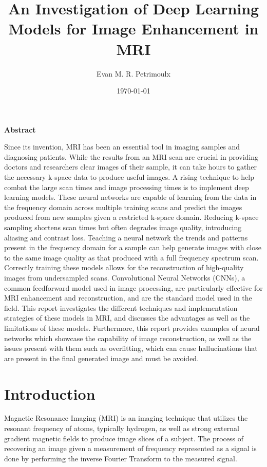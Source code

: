 \documentclass[14pt]{extreport}
\title{An Investigation of Deep Learning Models for Image Enhancement in MRI}
\author{Evan M. R. Petrimoulx}
\date{\today}
\renewenvironment{abstract}{
    \begin{center}
        \bfseries Abstract
    \end{center}
    \vspace{-1em} %
    \itshape
}{}
\begin{document}
    \maketitle
    \setcounter{page}{2}
    \vspace{-2cm}
    \begin{abstract}
        \indent Since its invention, MRI has been an essential tool in imaging samples and diagnosing patients. While the results from an MRI scan are crucial in providing doctors and researchers clear images of their sample, it can take hours to gather the necessary k-space data to produce useful images. A rising technique to help combat the large scan times and image processing times is to implement deep learning models. These neural networks are capable of learning from the data in the frequency domain across multiple training scans and predict the images produced from new samples given a restricted k-space domain. Reducing k-space sampling shortens scan times but often degrades image quality, introducing aliasing and contrast loss. Teaching a neural network the trends and patterns present in the frequency domain for a sample can help generate images with close to the same image quality as that produced with a full frequency spectrum scan. Correctly training these models allows for the reconstruction of high-quality images from undersampled scans. Convolutional Neural Networks (CNNs), a common feedforward model used in image processing, are particularly effective for MRI enhancement and reconstruction, and are the standard model used in the field. This report investigates the different techniques and implementation strategies of these models in MRI, and discusses the advantages as well as the limitations of these models. Furthermore, this report provides examples of neural networks which showcase the capability of image reconstruction, as well as the issues present with them such as overfitting, which can cause hallucinations that are present in the final generated image and must be avoided.
    \end{abstract}

    \section*{Introduction}
        \indent Magnetic Resonance Imaging (MRI) is an imaging technique that utilizes the resonant frequency of atoms, typically hydrogen, as well as strong external gradient magnetic fields to produce image slices of a subject. The process of recovering an image given a measurement of frequency represented as a signal is done by performing the inverse Fourier Transform to the measured signal.
\end{document}
